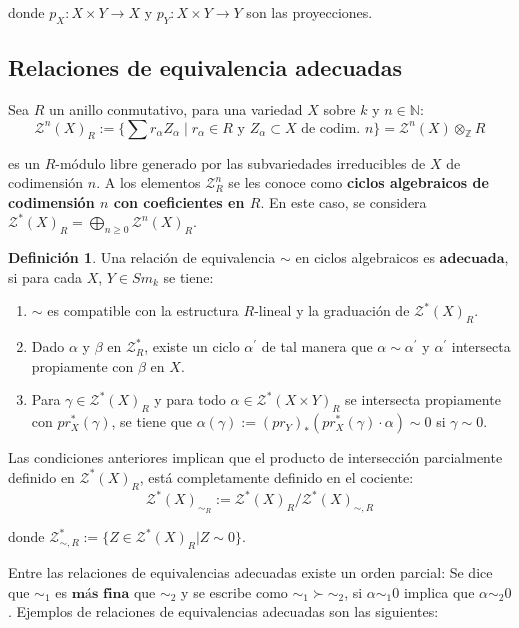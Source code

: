\documentclass[10pt]{amsart}
\theoremstyle{definition}
\newtheorem{definition}{Definici\'on}[section]
\theoremstyle{remark}
\theoremstyle{definition}
\begin{document}
donde $p_{X}:X \times Y  \rightarrow X$ y $p_{Y}:X \times Y \rightarrow Y$ son las proyecciones.

\subsection{Relaciones de equivalencia adecuadas}
Sea $R$ un anillo conmutativo, para una variedad $X$ sobre $\mathit{k}$ y $n \in \mathbb{N}$:
\[
\mathcal{Z}^n(X)_R := \{ \sum r_{\alpha} Z_{\alpha} \mid r_{\alpha} \in R \text{ y } Z_{\alpha} \subset X \text{ de codim. } n \} = \mathcal{Z}^n(X) \otimes_{\mathbb{Z}} R
\]

es un $R$-módulo libre generado por las subvariedades irreducibles de $X$ de codimensión $n$. A los elementos $\mathcal{Z}^{n}_{R}$ se les conoce como \textbf{ciclos algebraicos de codimensión $n$ con coeficientes en $R$}. En este caso, se considera $\mathcal{Z}^{*}(X)_{R}=\bigoplus_{n \geq 0} \mathcal{Z}^{n}(X)_{R}$.

\begin{definition}
Una relación de equivalencia $\sim$ en ciclos algebraicos es $\textbf{adecuada}$, si para cada $X$, $Y \in Sm_{\mathit{k}}$ se tiene:
\begin{enumerate}
\item $\sim$ es compatible con la estructura $R$-lineal y la graduación de $\mathcal{Z}^{*}(X)_{R}$.
\item Dado $\alpha$ y $\beta$ en $\mathcal{Z}^{*}_{R}$, existe un ciclo $\alpha^{\prime}$ de tal manera que $\alpha \sim \alpha^{\prime}$ y $\alpha^{\prime}$ intersecta propiamente con $\beta$ en $X$.
\item Para $\gamma \in \mathcal{Z}^{*}(X)_{R}$ y para todo $\alpha \in \mathcal{Z}^{*}(X \times Y)_{R}$ se intersecta propiamente con $pr^{*}_{X}(\gamma)$, se tiene que $\alpha(\gamma):=(pr_{Y})_{*}(pr^{*}_{X}(\gamma) \cdot \alpha) \sim 0$ si $\gamma \sim 0$.
\end{enumerate}
\end{definition}
Las condiciones anteriores implican que el producto de intersección parcialmente definido en $\mathcal{Z}^{*}(X)_{R}$, está completamente definido en el cociente:
\begin{equation*}
\mathcal{Z}^{*}(X)_{{\sim}_{R}}:=\mathcal{Z}^{*}(X)_{R}/\mathcal{Z}^{*}(X)_{{\sim},R}
\end{equation*}

donde $\mathcal{Z}^{*}_{{\sim},R}:=\{Z \in \mathcal{Z}^{*}(X)_{R}|Z \sim 0\}$.

Entre las relaciones de equivalencias adecuadas existe un orden parcial: Se dice que $\sim_{1}$ es $\textbf{más fina}$ que $\sim_{2}$ y se escribe como $\sim_{1} \succ \sim_{2}$, si $\alpha \sim_{1} 0$ implica que $\alpha\sim_{2} 0$. Ejemplos de relaciones de equivalencias adecuadas son las siguientes:
\end{document}
